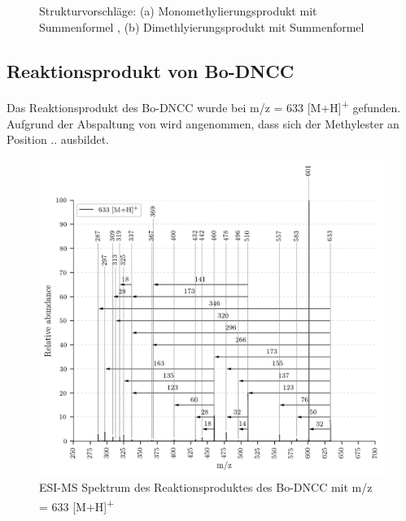 \begin{figure}[!htbp]
\begin{subfigure}[b]{0.5\textwidth}
    \caption{}
    \label{fig:645MHStruktur}
  \end{subfigure}
  \caption[Strukturvorschläge für das Mono- und Dimethylierungsprodukt des Bo-DYCC, Quelle: Autor]{Strukturvorschläge: (a) Monomethylierungsprodukt mit Summenformel , (b) Dimethlyierungsprodukt mit Summenformel }
\end{figure}

\subsection{Reaktionsprodukt von Bo-DNCC}

Das Reaktionsprodukt des Bo-DNCC wurde bei m/z = 633 [M+H]\textsuperscript{+} gefunden. Aufgrund der Abspaltung von  wird angenommen, dass sich der Methylester an Position .. ausbildet.

\begin{figure}[!htbp]
  \centering
  \includegraphics[width=\textwidth, height=0.7\textwidth]{figures/Kapitel7/Kataboliten/VWA_MS_633.png}
  \caption[ESI-MS Spektrum des Reaktionsproduktes von Bo-DNCC, Quelle: Autor]{ESI-MS Spektrum des Reaktionsproduktes des Bo-DNCC mit m/z = 633 [M+H]\textsuperscript{+}}
  \label{fig:633MH}
\end{figure}

